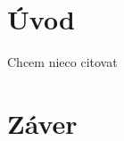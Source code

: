 
%

\chapter{Úvod}
\label{uvod}

Chcem nieco citovat \cite{automatic-js-restrictor-testing}

\chapter{Záver}
\label{zaver}



%
